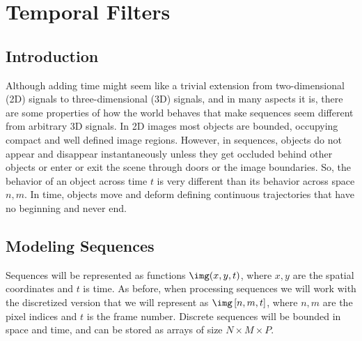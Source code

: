 

\chapter{Temporal Filters}
\label{chapter:temporal_filters}



\section{Introduction}

Although adding time might seem like a trivial extension from two-dimensional (2D) signals to three-dimensional (3D) signals, and in many aspects it is, there are some properties of how the world behaves that make sequences seem different from arbitrary 3D signals. In 2D images most objects are bounded, occupying compact and well defined image regions. However, in sequences, objects do not appear and disappear instantaneously unless they get occluded behind other objects or enter or exit the scene through doors or the image boundaries. So, the behavior of an object across time $t$ is very different than its behavior across space $n,m$. In time, objects move and deform defining continuous trajectories that have no beginning and never end. 


\section{Modeling Sequences}
\label{sect:modelingSequences}

Sequences will be represented as functions $\img (x,y,t)$, where $x,y$ are the spatial coordinates and $t$ is time. As before, when processing sequences we will work with the discretized version that we will represent as $\img \left[n,m,t \right]$, where $n,m$ are the pixel indices and $t$ is the frame number. Discrete sequences will be bounded in space and time, and can be stored as arrays of size $N \times M \times P$.


